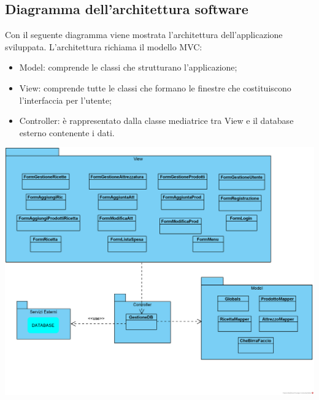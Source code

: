 \documentclass[a4paper, titlepage]{article}
\begin{document}
\subsection{Diagramma dell'architettura software}
Con il seguente diagramma viene mostrata l'architettura dell'applicazione sviluppata.
L'architettura richiama il modello MVC:
\begin{itemize}
    \item Model: comprende le classi che strutturano l'applicazione;
    \item View: comprende tutte le classi che formano le finestre che costituiscono l'interfaccia per l'utente;
    \item Controller: è rappresentato dalla classe mediatrice tra View e il database esterno contenente i dati.
\end{itemize}
\includegraphics[scale=0.70]{Immagini/Diagramma Architettura Software_Brew Day!.png}

\newpage
\end{document}
